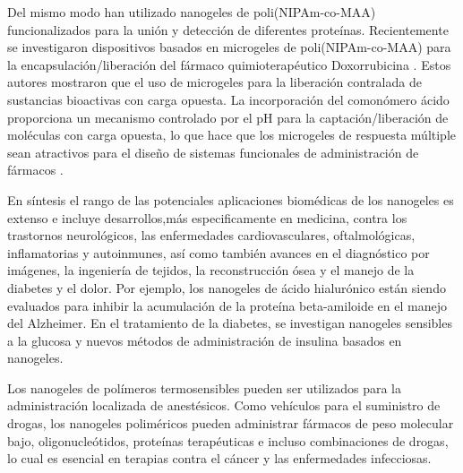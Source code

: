 Del mismo modo \citet{Culver2017A}han utilizado nanogeles de poli(NIPAm-co-MAA) funcionalizados para la uni\'on y detecci\'on de diferentes prote\'inas. 
Recientemente se investigaron dispositivos basados en microgeles de poli(NIPAm-co-MAA) para la encapsulación/liberaci\'on del f\'armaco quimioterap\'eutico Doxorrubicina \cite{Giussi2020, MartinezMoro2020, Pergushov2020}. Estos autores mostraron que el uso de microgeles para la liberaci\'on contralada de sustancias bioactivas con carga opuesta. 
La incorporaci\'on del comon\'omero \'acido proporciona un mecanismo controlado por el pH para la captaci\'on/liberaci\'on de mol\'eculas con carga opuesta, lo que hace que los microgeles de respuesta m\'ultiple sean atractivos para el dise\~no de sistemas funcionales de administraci\'on de f\'armacos \cite{Liu2017}.

En s\'intesis el  rango de las potenciales aplicaciones biom\'edicas de los nanogeles es extenso e incluye desarrollos,m\'as especificamente en medicina, contra los trastornos neurol\'ogicos, las enfermedades cardiovasculares, oftalmol\'ogicas, inflamatorias y autoinmunes, as\'i como tambi\'en avances en el diagn\'ostico por im\'agenes, la ingenier\'ia de tejidos, la reconstrucci\'on \'osea y el manejo de la diabetes y el dolor. Por ejemplo, los nanogeles de \'acido hialur\'onico est\'an siendo evaluados para inhibir la acumulaci\'on de la prote\'ina beta-amiloide en el manejo del Alzheimer. En el tratamiento de la diabetes, se investigan nanogeles sensibles a la glucosa y nuevos m\'etodos de administraci\'on de insulina basados en nanogeles.

Los nanogeles de pol\'imeros termosensibles pueden ser utilizados para la administraci\'on localizada de anest\'esicos. Como veh\'iculos para el suministro de drogas, los nanogeles polim\'ericos pueden administrar f\'armacos de peso molecular bajo, oligonucle\'otidos, prote\'inas terap\'euticas e incluso combinaciones de drogas, lo cual es esencial en terapias contra el c\'ancer y las enfermedades infecciosas.

